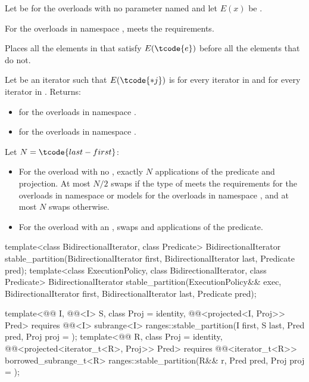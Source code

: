 \begin{itemdescr}
\pnum
Let  be 
for the overloads with no parameter named 
and let $E(x)$ be .

\pnum
\expects
For the overloads in namespace ,
 meets
the  requirements.

\pnum
\effects
Places all the elements  in 
that satisfy $E(\tcode{e})$ before all the elements that do not.

\pnum
\returns
Let  be an iterator such that $E(\tcode{*j})$ is
 for every iterator  in  and
 for every iterator  in .
Returns:
\begin{itemize}
\item {} for the overloads in namespace .
\item {} for the overloads in namespace .
\end{itemize}


\pnum
\complexity
Let $N = \tcode{last - first}$:
\begin{itemize}
\item
  For the overload with no ,
  exactly $N$ applications of the predicate and projection.
  At most $N / 2$ swaps if the type of  meets
  the  requirements
  for the overloads in namespace  or
  models 
  for the overloads in namespace ,
  and at most $N$ swaps otherwise.
\item
  For the overload with an ,
   swaps and  applications of the predicate.
\end{itemize}
\end{itemdescr}

%
\begin{itemdecl}
template<class BidirectionalIterator, class Predicate>
  BidirectionalIterator
    stable_partition(BidirectionalIterator first, BidirectionalIterator last, Predicate pred);
template<class ExecutionPolicy, class BidirectionalIterator, class Predicate>
  BidirectionalIterator
    stable_partition(ExecutionPolicy&& exec,
                     BidirectionalIterator first, BidirectionalIterator last, Predicate pred);

template<@@ I, @@<I> S, class Proj = identity,
         @@<projected<I, Proj>> Pred>
  requires @@<I>
  subrange<I> ranges::stable_partition(I first, S last, Pred pred, Proj proj = {});
template<@@ R, class Proj = identity,
         @@<projected<iterator_t<R>, Proj>> Pred>
  requires @@<iterator_t<R>>
  borrowed_subrange_t<R> ranges::stable_partition(R&& r, Pred pred, Proj proj = {});
\end{itemdecl}

